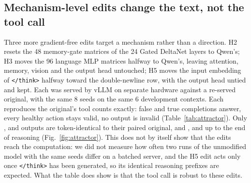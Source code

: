 \subsection{Mechanism-level edits change the text, not the tool call}
\label{sec:attractor}
Three more gradient-free edits target a mechanism rather than a direction. H2 resets the 48 memory-gate matrices of the 24 Gated DeltaNet layers to Qwen's; H3 moves the 96 language MLP matrices halfway to Qwen's, leaving attention, memory, vision and the output head untouched; H5 moves the input embedding of \texttt{</think>} halfway toward the double-newline row, with the output head untied and kept. %
Each was served by vLLM on separate hardware against a re-served original, with the same 8 seeds on the same 6 development contexts. Each reproduces the original's tool counts exactly: \attHtwoFsp{} false and \attHtwoFsm{} true completions answer, every healthy action stays valid, no output is invalid (Table~\ref{tab:attractor}). Only \attHtwoFull, \attHthreehalfFull{} and \attHfivehalfFull{} outputs are token-identical to their paired original, and \attHtwoReason, \attHthreehalfReason{} and \attHfivehalfReason{} up to the end of reasoning (Fig.~\ref{fig:attractor}). This does not by itself show that the edits reach the computation: we did not measure how often two runs of the unmodified model with the same seeds differ on a batched server, and the H5 edit acts only once \texttt{</think>} has been generated, so its identical reasoning prefixes are expected. What the table does show is that the tool call is robust to these edits. %

